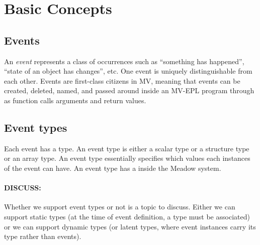 \documentclass{pamsbook}
\begin{document}




\section{Basic Concepts}

\subsection{Events}
An {\em event} represents a class of occurrences such as ``something has
happened'', ``state of an object has changes'', etc. One event is uniquely
distinguishable from each other.  
Events are first-class citizens in MV, meaning that events can be
created, deleted, named, and passed around inside an MV-EPL program through
as function calls arguments and return values. 

\subsection{Event types}
Each event has a type. An event type is either a scalar type or 
a structure type or an array type.
An event type essentially specifies which
values each instances of the event can have. 
An event type has a  inside the Meadow system. 

\paragraph{DISCUSS: } Whether we support event types or not is a topic to
discuss. Either we can support static types (at the time of event definition,
a type must be associated) or we can support dynamic types (or latent types,
where event instances carry its type rather than events). 
\end{document}
